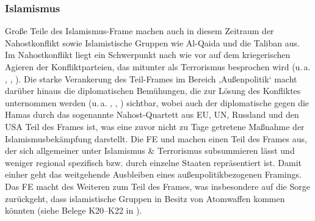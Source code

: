 \subsubsection{Islamismus}\label{islamismus-3}

Große Teile des Islamismus-Frame machen auch in diesem Zeitraum der Nahostkonflikt sowie Islamistische Gruppen wie Al-Qaida und die Taliban aus. Im Nahostkonflikt liegt ein Schwerpunkt nach wie vor auf dem kriegerischen Agieren der Konfliktparteien, das mitunter als Terrorismus besprochen wird (u.\,a. , , ). Die starke Verankerung des Teil-Frames im Bereich ‚Außenpolitik` macht darüber hinaus die diplomatischen Bemühungen, die zur Lösung des Konfliktes unternommen werden (u.\,a. , , ) sichtbar, wobei auch der diplomatische  gegen die Hamas durch das sogenannte Nahost-Quartett aus EU, UN, Russland und den USA Teil des Frames ist, was eine zuvor nicht zu Tage getretene Maßnahme der Islamismusbekämpfung darstellt. Die FE  und  machen einen Teil des Frames aus, der sich allgemeiner unter Islamismus \& Terrorismus subsummieren lässt und weniger regional spezifisch bzw. durch einzelne Staaten repräsentiert ist. Damit einher geht das weitgehende Ausbleiben eines außenpolitikbezogenen Framings. Das FE  macht des Weiteren  zum Teil des Frames, was insbesondere auf die Sorge zurückgeht, dass islamistische Gruppen in Besitz von Atomwaffen kommen könnten (siehe Belege K20--K22 in ).

